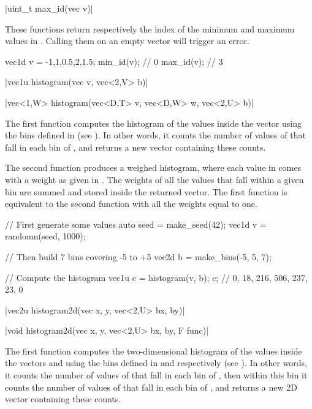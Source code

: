 \cppinline|uint_t max_id(vec v)| 

These functions return respectively the index of the minimum and maximum values in . Calling them on an empty vector will trigger an error.

\begin{example}
\begin{cppcode}
vec1d v = {-1,1,0.5,2,1.5};
min_id(v); // 0
max_id(v); // 3
\end{cppcode}
\end{example}

\funcitem \cppinline|vec1u histogram(vec v, vec<2,V> b)| 

\cppinline|vec<1,W> histogram(vec<D,T> v, vec<D,W> w, vec<2,U> b)|

The first  function computes the histogram of the values inside the vector  using the bins defined in  (see ). In other words, it counts the number of values of  that fall in each bin of , and returns a new vector containing these counts.

The second  function produces a weighed histogram, where each value in  comes with a weight as given in . The weights of all the values that fall within a given bin are summed and stored inside the returned vector. The first function is equivalent to the second function with all the weights equal to one.

\begin{example}
\begin{cppcode}
// First generate some values
auto seed = make_seed(42);
vec1d v = randomn(seed, 1000);

// Then build 7 bins covering -5 to +5
vec2d b = make_bins(-5, 5, 7);

// Compute the histogram
vec1u c = histogram(v, b);
c; // {0, 18, 216, 506, 237, 23, 0}
\end{cppcode}
\end{example}

\funcitem \cppinline|vec2u histogram2d(vec x, y, vec<2,U> bx, by)| 

\cppinline|void histogram2d(vec x, y, vec<2,U> bx, by, F func)|

The first  function computes the two-dimensional histogram of the values inside the vectors  and  using the bins defined in  and  respectively (see ). In other words, it counts the number of values of  that fall in each bin of , then within this bin it counts the number of values of  that fall in each bin of , and returns a new 2D vector containing these counts.

